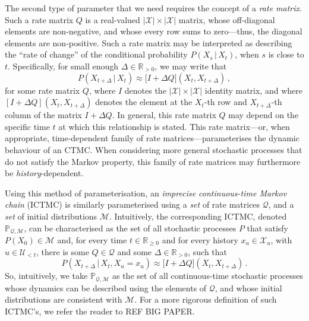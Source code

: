 \documentclass[twoside,11pt]{article}
\newcommand{\reals}{\mathbb{R}}
\newcommand{\realspos}{\reals_{>0}}
\newcommand{\realsnonneg}{\reals_{\geq 0}}
\newcommand{\states}{\mathcal{X}}
\newcommand{\rateset}{\mathcal{Q}}
\begin{document}
The second type of parameter that we need requires the concept of a \emph{rate matrix}. Such a rate matrix $Q$ is a real-valued $\lvert\states\rvert\times\lvert\states\rvert$ matrix, whose off-diagonal elements are non-negative, and whose every row sums to zero---thus, the diagonal elements are non-positive. Such a rate matrix may be interpreted as describing the ``rate of change'' of the conditional probability $P(X_s\,\vert\,X_t)$, when $s$ is close to $t$. Specifically, for small enough $\Delta\in\realspos$, we may write that
\begin{equation*}
P(X_{t+\Delta}\,\vert\,X_t) \approx \bigl[I + \Delta Q\bigr](X_t, X_{t+\Delta})\,,
\end{equation*}
for some rate matrix $Q$, where $I$ denotes the $\lvert\states\rvert\times\lvert\states\rvert$ identity matrix, and where $[I + \Delta Q](X_t,X_{t+\Delta})$ denotes the element at the $X_t$-th row and $X_{t+\Delta}$-th column of the matrix $I + \Delta Q$. In general, this rate matrix $Q$ may depend on the specific time $t$ at which this relationship is stated. This rate matrix---or, when appropriate, time-dependent family of rate matrices---parameterises the dynamic behaviour of an CTMC. When considering more general stochastic processes that do not satisfy the Markov property, this family of rate matrices may furthermore be \emph{history}-dependent.

Using this method of parameterisation, an \emph{imprecise continuous-time Markov chain} (ICTMC) is similarly parameterised using a \emph{set} of rate matrices $\rateset$, and a \emph{set} of initial distributions $\mathcal{M}$. Intuitively, the corresponding ICTMC, denoted $\mathbb{P}_{\rateset,\mathcal{M}}$, can be characterised as the set of all stochastic processes $P$ that satisfy $P(X_0)\in\mathcal{M}$ and, for every time $t\in\realsnonneg$ and for every history $x_u\in\states_u$, with $u\in\mathcal{U}_{<t}$, there is some $Q\in\rateset$ and some $\Delta\in\realspos$, such that
\begin{equation*}
P(X_{t+\Delta}\,\vert\,X_t,X_u=x_u) \approx \bigl[I + \Delta Q\bigr](X_t, X_{t+\Delta})\,.
\end{equation*}
So, intuitively, we take $\mathbb{P}_{\rateset,\mathcal{M}}$ as the set of all continuous-time stochastic processes whose dynamics can be described using the elements of $\rateset$, and whose initial distributions are consistent with $\mathcal{M}$. For a more rigorous definition of such ICTMC's, we refer the reader to REF BIG PAPER.
\end{document}

